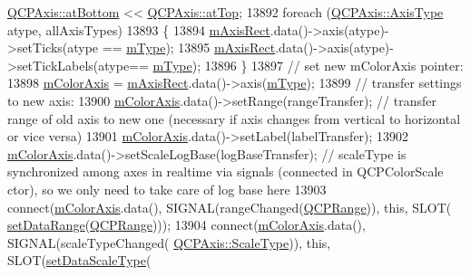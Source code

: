 \begin{DoxyCode}
      \hyperlink{class_q_c_p_axis_ae2bcc1728b382f10f064612b368bc18aa220d68888516b6c3b493d144f1ba438f}{QCPAxis::atBottom} << \hyperlink{class_q_c_p_axis_ae2bcc1728b382f10f064612b368bc18aac0ece2b680d3f545e701f75af1655977}{QCPAxis::atTop};
13892     \textcolor{keywordflow}{foreach} (\hyperlink{class_q_c_p_axis_ae2bcc1728b382f10f064612b368bc18a}{QCPAxis::AxisType} atype, allAxisTypes)
13893     \{
13894       \hyperlink{class_q_c_p_color_scale_a6e37f7d49cd614dc50ef1caae60461b9}{mAxisRect}.data()->axis(atype)->setTicks(atype == \hyperlink{class_q_c_p_color_scale_a7d47ed4ab76f38e50164e9d77fe33789}{mType});
13895       \hyperlink{class_q_c_p_color_scale_a6e37f7d49cd614dc50ef1caae60461b9}{mAxisRect}.data()->axis(atype)->setTickLabels(atype== \hyperlink{class_q_c_p_color_scale_a7d47ed4ab76f38e50164e9d77fe33789}{mType});
13896     \}
13897     \textcolor{comment}{// set new mColorAxis pointer:}
13898     \hyperlink{class_q_c_p_color_scale_a2efbc90fd31898fe05d2b74a8422b1d5}{mColorAxis} = \hyperlink{class_q_c_p_color_scale_a6e37f7d49cd614dc50ef1caae60461b9}{mAxisRect}.data()->axis(\hyperlink{class_q_c_p_color_scale_a7d47ed4ab76f38e50164e9d77fe33789}{mType});
13899     \textcolor{comment}{// transfer settings to new axis:}
13900     \hyperlink{class_q_c_p_color_scale_a2efbc90fd31898fe05d2b74a8422b1d5}{mColorAxis}.data()->setRange(rangeTransfer); \textcolor{comment}{// transfer range of old axis to new one
       (necessary if axis changes from vertical to horizontal or vice versa)}
13901     \hyperlink{class_q_c_p_color_scale_a2efbc90fd31898fe05d2b74a8422b1d5}{mColorAxis}.data()->setLabel(labelTransfer);
13902     \hyperlink{class_q_c_p_color_scale_a2efbc90fd31898fe05d2b74a8422b1d5}{mColorAxis}.data()->setScaleLogBase(logBaseTransfer); \textcolor{comment}{// scaleType is synchronized among axes
       in realtime via signals (connected in QCPColorScale ctor), so we only need to take care of log base here}
13903     connect(\hyperlink{class_q_c_p_color_scale_a2efbc90fd31898fe05d2b74a8422b1d5}{mColorAxis}.data(), SIGNAL(rangeChanged(\hyperlink{class_q_c_p_range}{QCPRange})), \textcolor{keyword}{this}, SLOT(
      \hyperlink{class_q_c_p_color_scale_abe88633003a26d1e756aa74984587fef}{setDataRange}(\hyperlink{class_q_c_p_range}{QCPRange})));
13904     connect(\hyperlink{class_q_c_p_color_scale_a2efbc90fd31898fe05d2b74a8422b1d5}{mColorAxis}.data(), SIGNAL(scaleTypeChanged(
      \hyperlink{class_q_c_p_axis_a36d8e8658dbaa179bf2aeb973db2d6f0}{QCPAxis::ScaleType})), \textcolor{keyword}{this}, SLOT(\hyperlink{class_q_c_p_color_scale_aeb6107d67dd7325145b2498abae67fc3}{setDataScaleType}(

\end{DoxyCode}
